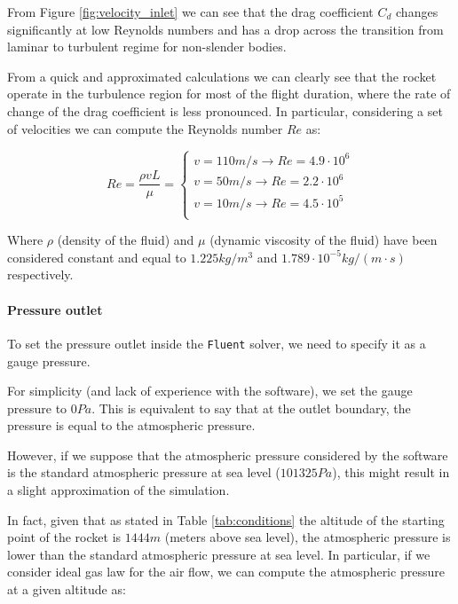 From Figure \ref{fig:velocity_inlet} we can see that the drag coefficient $C_d$ changes significantly at low Reynolds numbers and has a drop across the transition from laminar to turbulent regime for non-slender bodies.

From a quick and approximated calculations we can clearly see that the rocket operate in the turbulence region for most of the flight duration, where the rate of change of the drag coefficient is less pronounced.
In particular, considering a set of velocities we can compute the Reynolds number $Re$ as:

\begin{equation}
    Re = \frac{\rho v L}{\mu} = \begin{cases}
        v = 110m/s \rightarrow Re = 4.9 \cdot 10^6 \\
        v = 50m/s \rightarrow Re = 2.2 \cdot 10^6  \\
        v = 10m/s \rightarrow Re = 4.5 \cdot 10^5  \\
    \end{cases}
\end{equation}

Where $\rho$ (density of the fluid) and $\mu$ (dynamic viscosity of the fluid) have been considered constant and equal to $1.225kg/m^3$ and $1.789 \cdot 10^{-5}kg/(m \cdot s)$ respectively.


\paragraph{Pressure outlet}

To set the pressure outlet inside the \texttt{Fluent} solver, we need to specify it as a gauge pressure.

For simplicity (and lack of experience with the software), we set the gauge pressure to $0Pa$.
This is equivalent to say that at the outlet boundary, the pressure is equal to the atmospheric pressure.

However, if we suppose that the atmospheric pressure considered by the software is the standard atmospheric pressure at sea level ($101325Pa$), this might result in a slight approximation of the simulation.

In fact, given that as stated in Table \ref{tab:conditions} the altitude of the starting point of the rocket is $1444m$ (meters above sea level), the atmospheric pressure is lower than the standard atmospheric pressure at sea level.
In particular, if we consider ideal gas law for the air flow, we can compute the atmospheric pressure at a given altitude as:

